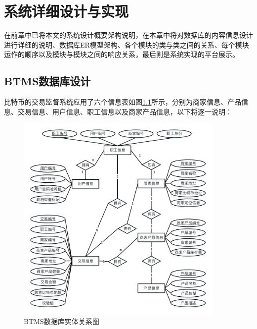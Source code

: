 \chapter{系统详细设计与实现}
在前章中已将本文的系统设计概要架构说明，在本章中将对数据库的内容信息设计进行详细的说明、数据库ER模型架构、各个模块的类与类之间的关系、每个模块运作的顺序以及模块与模块之间的响应关系，最后则是系统实现的平台展示。

	\section{BTMS数据库设计}

	比特币的交易监督系统应用了六个信息表如图\ref{db}所示，分别为商家信息、产品信息、交易信息、用户信息、职工信息以及商家产品信息，以下将逐一说明：

		\begin{figure}[!htbp]
			\centering
			\includegraphics[width = 0.9\textwidth]{er.pdf}
			\caption{BTMS数据库实体关系图}\label{db}
		\end{figure}

